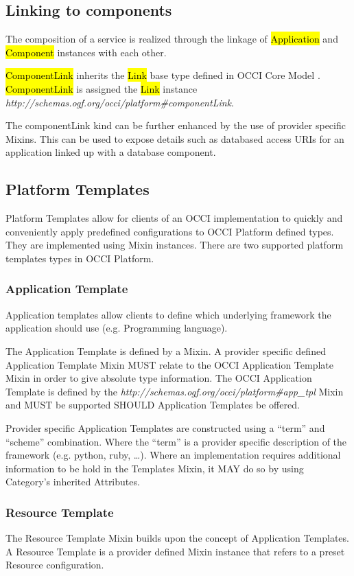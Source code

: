 \documentclass[10pt,a4paper]{article}
\begin{document}
\subsection{Linking to components}

The composition of a service is realized through the linkage of \hl{Application} and \hl{Component} instances with each other. 

\hl{ComponentLink} inherits the \hl{Link} base type defined in OCCI Core Model \cite{occi:core}. \hl{ComponentLink} is assigned the \hl{Link} instance \textit{http://schemas.ogf.org/occi/platform\#componentLink}.

The componentLink kind can be further enhanced by the use of  provider specific Mixins. This can be used to expose details such as databased access URIs for an application linked up with a database component.

\subsection{Platform Templates}
Platform Templates allow for clients of an OCCI implementation to quickly and conveniently apply predefined configurations to OCCI Platform defined types. They are implemented using Mixin instances. There are two supported platform templates types in OCCI Platform.

\subsubsection{Application Template}
Application templates allow clients to define which underlying framework the application should use (e.g. Programming language). 

The Application Template is defined by a Mixin. A provider specific defined Application Template Mixin MUST relate to the OCCI Application Template Mixin in order to give absolute type information. The OCCI Application Template is defined by the \textit{http://schemas.ogf.org/occi/platform\#app\_tpl} Mixin and MUST be supported SHOULD Application Templates be offered.

Provider specific Application Templates are constructed using a “term” and “scheme” combination. Where the “term” is a provider specific description of the framework (e.g. python, ruby, …). Where an implementation requires additional information to be hold in the Templates Mixin, it MAY do so by using Category’s inherited Attributes.

\subsubsection{Resource Template}
The Resource Template Mixin builds upon the concept of Application Templates. A Resource Template is a provider defined Mixin instance that refers to a preset Resource configuration.
\end{document}
